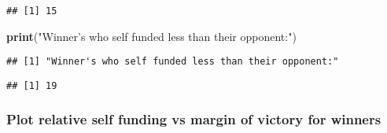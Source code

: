 \documentclass[
]{article}
\newenvironment{Shaded}{\begin{snugshade}}{\end{snugshade}}
\newcommand{\DecValTok}[1]{\textcolor[rgb]{0.00,0.00,0.81}{#1}}
\newcommand{\FloatTok}[1]{\textcolor[rgb]{0.00,0.00,0.81}{#1}}
\newcommand{\KeywordTok}[1]{\textcolor[rgb]{0.13,0.29,0.53}{\textbf{#1}}}
\newcommand{\NormalTok}[1]{#1}
\newcommand{\OperatorTok}[1]{\textcolor[rgb]{0.81,0.36,0.00}{\textbf{#1}}}
\newcommand{\StringTok}[1]{\textcolor[rgb]{0.31,0.60,0.02}{#1}}
\begin{document}
\begin{Shaded}
\end{Shaded}

\begin{verbatim}
## [1] 15
\end{verbatim}

\begin{Shaded}
\begin{Highlighting}[]
\KeywordTok{print}\NormalTok{(}\StringTok{"Winner's who self funded less than their opponent:"}\NormalTok{)}
\end{Highlighting}
\end{Shaded}

\begin{verbatim}
## [1] "Winner's who self funded less than their opponent:"
\end{verbatim}

\begin{Shaded}
\end{Shaded}

\begin{verbatim}
## [1] 19
\end{verbatim}

\hypertarget{plot-relative-self-funding-vs-margin-of-victory-for-winners}{%
\subsubsection{Plot relative self funding vs margin of victory for
winners}\label{plot-relative-self-funding-vs-margin-of-victory-for-winners}}
\end{document}
